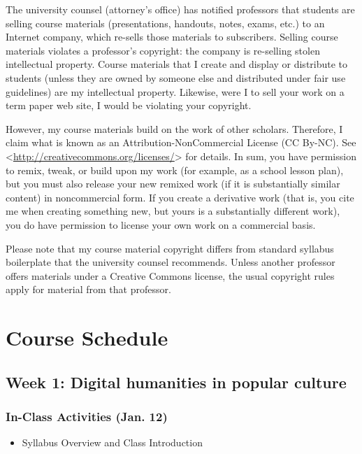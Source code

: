 \documentclass[]{article}
\begin{document}
The university counsel (attorney's office) has notified professors that
students are selling course materials (presentations, handouts, notes,
exams, etc.) to an Internet company, which re-sells those materials to
subscribers. Selling course materials violates a professor's copyright:
the company is re-selling stolen intellectual property. Course materials
that I create and display or distribute to students (unless they are
owned by someone else and distributed under fair use guidelines) are my
intellectual property. Likewise, were I to sell your work on a term
paper web site, I would be violating your copyright.

However, my course materials build on the work of other scholars.
Therefore, I claim what is known as an Attribution-NonCommercial License
(CC By-NC). See
\textless{}\url{http://creativecommons.org/licenses/}\textgreater{} for
details. In sum, you have permission to remix, tweak, or build upon my
work (for example, as a school lesson plan), but you must also release
your new remixed work (if it is substantially similar content) in
noncommercial form. If you create a derivative work (that is, you cite
me when creating something new, but yours is a substantially different
work), you do have permission to license your own work on a commercial
basis.

Please note that my course material copyright differs from standard
syllabus boilerplate that the university counsel recommends. Unless
another professor offers materials under a Creative Commons license, the
usual copyright rules apply for material from that professor.

\section{Course Schedule}\label{course-schedule}

\subsection{Week 1: Digital humanities in popular
culture}\label{week-1-digital-humanities-in-popular-culture}

\subsubsection{In-Class Activities (Jan.
12)}\label{in-class-activities-jan.-12}

\begin{itemize}
\itemsep1pt\parskip0pt
\item
  Syllabus Overview and Class Introduction
\end{itemize}
\end{document}
